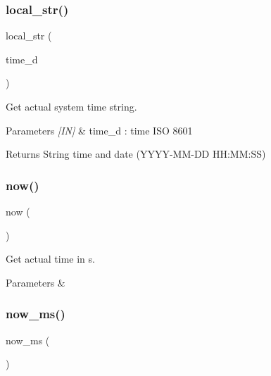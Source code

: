 \subsubsection{local\_str()}
{\footnotesize\ttfamily local\+\_\+str (\begin{DoxyParamCaption}\item[{time\+\_\+d}]{ }\end{DoxyParamCaption})}



Get actual system time string. 


\begin{DoxyCode}{0}
\end{DoxyCode}



\begin{DoxyParams}{Parameters}
{\em \mbox{[}\+I\+N\mbox{]}} & time\+\_\+d \+: time I\+SO 8601 \\
\hline
\end{DoxyParams}
\begin{DoxyReturn}{Returns}
String time and date (Y\+Y\+Y\+Y-\/\+M\+M-\/\+DD H\+H\+:\+MM\+:SS) 
\end{DoxyReturn}
\mbox{\label{classtime_a80593ccdc0339775ddd5d82c37ca4f6b}} 
\subsubsection{now()}
{\footnotesize\ttfamily now (\begin{DoxyParamCaption}{ }\end{DoxyParamCaption})}



Get actual time in s. 


\begin{DoxyCode}{0}
\end{DoxyCode}



\begin{DoxyParams}{Parameters}
{\em } & \\
\hline
\end{DoxyParams}
\mbox{\label{classtime_a94c9883e54d4b8ed4417920c65bd70dc}} 
\subsubsection{now\_ms()}
{\footnotesize\ttfamily now\+\_\+ms (\begin{DoxyParamCaption}{ }\end{DoxyParamCaption})}



